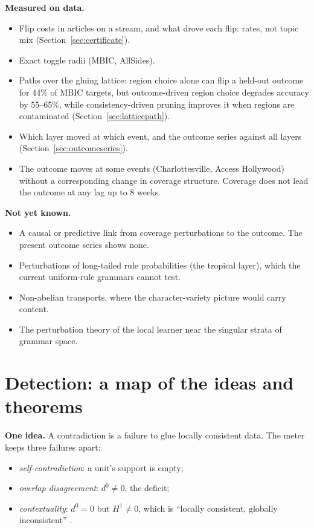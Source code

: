 \documentclass[11pt]{article}
\theoremstyle{definition}
\theoremstyle{remark}
\begin{document}
\textbf{Measured on data.}
\begin{itemize}
  \item Flip costs in articles on a stream, and what drove each flip: rates, not topic mix (Section~\ref{sec:certificate}).
  \item Exact toggle radii (MBIC, AllSides).
  \item Paths over the gluing lattice: region choice alone can flip a held-out outcome for 44\% of MBIC targets, but outcome-driven region choice degrades accuracy by 55--65\%, while consistency-driven pruning improves it when regions are contaminated (Section~\ref{sec:latticepath}).
  \item Which layer moved at which event, and the outcome series against all layers (Section~\ref{sec:outcomeseries}).
  \item The outcome moves at some events (Charlottesville, Access Hollywood) without a corresponding change in coverage structure. Coverage does not lead the outcome at any lag up to 8 weeks.
\end{itemize}

\textbf{Not yet known.}
\begin{itemize}
  \item A causal or predictive link from coverage perturbations to the outcome. The present outcome series shows none.
  \item Perturbations of long-tailed rule probabilities (the tropical layer), which the current uniform-rule grammars cannot test.
  \item Non-abelian transports, where the character-variety picture would carry content.
  \item The perturbation theory of the local learner near the singular strata of grammar space.
\end{itemize}

\section{Detection: a map of the ideas and theorems}\label{sec:detmap}
\textbf{One idea.} A contradiction is a failure to glue locally consistent data. The meter keeps three failures apart:
\begin{itemize}
  \item \emph{self-contradiction}: a unit's support is empty;
  \item \emph{overlap disagreement}: $d^0\neq0$, the deficit;
  \item \emph{contextuality}: $d^0=0$ but $H^1\neq0$, which is ``locally consistent, globally inconsistent'' \cite{abramsky20}.
\end{itemize}
\end{document}
